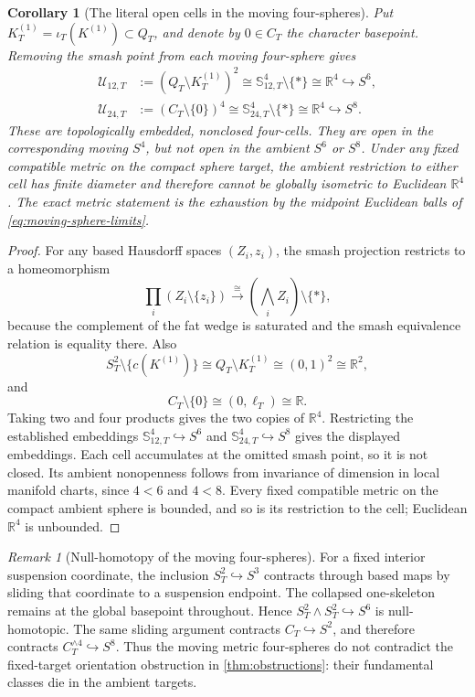 \documentclass[11pt,letterpaper]{article}
\numberwithin{equation}{section}
\newtheorem{corollary}[theorem]{Corollary}
\theoremstyle{definition}
\theoremstyle{remark}
\newtheorem{remark}[theorem]{Remark}
\newcommand{\R}{\mathbb R}
\begin{document}
\begin{corollary}[The literal open cells in the moving four-spheres]
\label{cor:moving-open-R4-cells}
Put \(K_T^{(1)}=\iota_T(K^{(1)})\subset Q_T\), and denote by \(0\in C_T\)
the character basepoint.  Removing the smash point from each moving
four-sphere gives
\begin{align}
 \mathcal U_{12,T}
 &:=(Q_T\setminus K_T^{(1)})^2
 \cong\mathbb S_{12,T}^4\setminus\{*\}
 \cong\R^4
 \hookrightarrow S^6,
 \label{eq:U12-open-cell}\\
 \mathcal U_{24,T}
 &:=(C_T\setminus\{0\})^4
 \cong\mathbb S_{24,T}^4\setminus\{*\}
 \cong\R^4
 \hookrightarrow S^8.
 \label{eq:U24-open-cell}
\end{align}
These are topologically embedded, nonclosed four-cells.  They are open in
the corresponding moving \(S^4\), but not open in the ambient \(S^6\) or
\(S^8\).  Under any fixed compatible metric on the compact sphere target,
the ambient restriction to either cell has finite diameter and therefore
cannot be globally isometric to Euclidean \(\R^4\).  The exact metric
statement is the exhaustion by the midpoint Euclidean balls of
\cref{eq:moving-sphere-limits}.
\end{corollary}

\begin{proof}
For any based Hausdorff spaces \((Z_i,z_i)\), the smash projection restricts
to a homeomorphism
\[
 \prod_i(Z_i\setminus\{z_i\})
 \xrightarrow{\ \cong\ }
 \left(\bigwedge_i Z_i\right)\setminus\{*\},
\]
because the complement of the fat wedge is saturated and the smash
equivalence relation is equality there.  Also
\[
 S_T^2\setminus\{c(K^{(1)})\}
 \cong Q_T\setminus K_T^{(1)}
 \cong(0,1)^2\cong\R^2,
\]
and
\[
 C_T\setminus\{0\}\cong(0,\ell_T)\cong\R.
\]
Taking two and four products gives the two copies of \(\R^4\).  Restricting
the established embeddings
\(\mathbb S_{12,T}^4\hookrightarrow S^6\) and
\(\mathbb S_{24,T}^4\hookrightarrow S^8\) gives the displayed embeddings.
Each cell accumulates at the omitted smash point, so it is not closed.
Its ambient nonopenness follows from invariance of dimension in local
manifold charts, since \(4<6\) and \(4<8\).  Every fixed compatible metric
on the compact ambient sphere is bounded, and so is its restriction to the
cell; Euclidean \(\R^4\) is unbounded.
\end{proof}

\begin{remark}[Null-homotopy of the moving four-spheres]
\label{rem:moving-sphere-null}
For a fixed interior suspension coordinate, the inclusion
\(S_T^2\hookrightarrow S^3\) contracts through based maps by sliding that
coordinate to a suspension endpoint.  The collapsed one-skeleton remains
at the global basepoint throughout.  Hence
\(S_T^2\wedge S_T^2\hookrightarrow S^6\) is null-homotopic.  The same
sliding argument contracts \(C_T\hookrightarrow S^2\), and therefore
contracts \(C_T^{\wedge4}\hookrightarrow S^8\).  Thus the moving metric
four-spheres do not contradict the fixed-target orientation obstruction
in \cref{thm:obstructions}: their fundamental classes die in the ambient
targets.
\end{remark}
\end{document}
